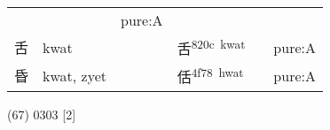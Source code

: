 \documentclass[14pt,a4paper]{scrartcl}
\begin{document}
\begin{longtable}[c]{@{}llllll@{}}
\begin{minipage}[t]{0.14\columnwidth}
\strut\end{minipage} &
\begin{minipage}[t]{0.14\columnwidth}\raggedright\strut
\strut\end{minipage} &
\begin{minipage}[t]{0.14\columnwidth}\raggedright\strut
pure:A
\strut\end{minipage}\tabularnewline
\begin{minipage}[t]{0.14\columnwidth}\raggedright\strut
舌
\strut\end{minipage} &
\begin{minipage}[t]{0.14\columnwidth}\raggedright\strut
kwat
\strut\end{minipage} &
\begin{minipage}[t]{0.14\columnwidth}\raggedright\strut
\strut\end{minipage} &
\begin{minipage}[t]{0.14\columnwidth}\raggedright\strut
舌\textsuperscript{820c~kwat}
\strut\end{minipage} &
\begin{minipage}[t]{0.14\columnwidth}\raggedright\strut
\strut\end{minipage} &
\begin{minipage}[t]{0.14\columnwidth}\raggedright\strut
pure:A
\strut\end{minipage}\tabularnewline
\begin{minipage}[t]{0.14\columnwidth}\raggedright\strut
昏
\strut\end{minipage} &
\begin{minipage}[t]{0.14\columnwidth}\raggedright\strut
kwat, zyet
\strut\end{minipage} &
\begin{minipage}[t]{0.14\columnwidth}\raggedright\strut
\strut\end{minipage} &
\begin{minipage}[t]{0.14\columnwidth}\raggedright\strut
佸\textsuperscript{4f78~hwat}
\strut\end{minipage} &
\begin{minipage}[t]{0.14\columnwidth}\raggedright\strut
\strut\end{minipage} &
\begin{minipage}[t]{0.14\columnwidth}\raggedright\strut
pure:A
\strut\end{minipage}\tabularnewline
\bottomrule
\end{longtable}

(67) 0303 {[}2{]}
\end{document}
